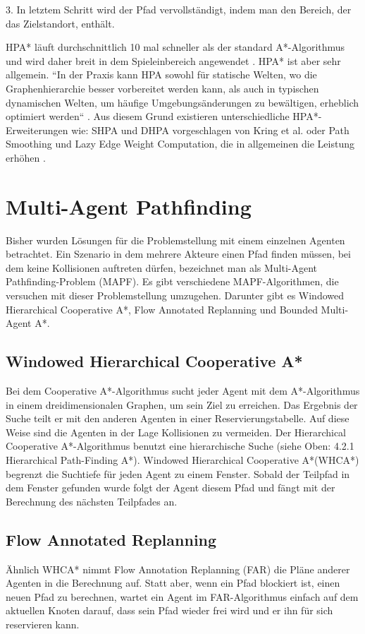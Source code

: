 3. In letztem Schritt wird der Pfad vervollständigt, indem man den Bereich, der das Zielstandort, enthält.\\
\begin{sloppypar}
HPA* läuft durchschnittlich 10 mal schneller als der standard A*-Algorithmus \cite{Bot04} und wird daher breit in dem Spieleinbereich angewendet \cite{LSC08}\cite{Kri10}. HPA* ist aber sehr allgemein. ``In der Praxis kann HPA sowohl für statische Welten, wo die Graphenhierarchie besser vorbereitet werden kann, als auch in typischen dynamischen Welten, um häufige Umgebungsänderungen zu bewältigen, erheblich optimiert werden`` \cite{Kri10}. Aus diesem Grund existieren unterschiedliche  HPA*-Erweiterungen wie: SHPA und DHPA vorgeschlagen von Kring et al.\cite{Kri10} oder Path Smoothing und Lazy Edge Weight Computation, die in allgemeinen die Leistung erhöhen \cite{JB07}.
\end{sloppypar}



\section{Multi-Agent Pathfinding}
Bisher wurden Lösungen für die Problemstellung mit einem einzelnen Agenten betrachtet. Ein Szenario in dem mehrere Akteure einen Pfad finden müssen, bei dem keine Kollisionen auftreten dürfen, bezeichnet man als Multi-Agent Pathfinding-Problem (MAPF). Es gibt verschiedene MAPF-Algorithmen, die versuchen mit dieser Problemstellung umzugehen. Darunter gibt es Windowed Hierarchical Cooperative A*, Flow Annotated Replanning und Bounded Multi-Agent A*.

\subsection{Windowed Hierarchical Cooperative A*}
Bei dem Cooperative A*-Algorithmus sucht jeder Agent mit dem A*-Algorithmus in einem dreidimensionalen Graphen, um sein Ziel zu erreichen. Das Ergebnis der Suche teilt er mit den anderen Agenten in einer Reservierungstabelle. Auf diese Weise sind die Agenten in der Lage Kollisionen zu vermeiden. Der Hierarchical Cooperative A*-Algorithmus benutzt eine hierarchische Suche (siehe Oben: 4.2.1 Hierarchical Path-Finding A*). Windowed Hierarchical Cooperative A*(WHCA*) begrenzt die Suchtiefe für jeden Agent zu einem Fenster. Sobald der Teilpfad in dem Fenster gefunden wurde folgt der Agent diesem Pfad und fängt mit der Berechnung des nächsten Teilpfades an.
\subsection{Flow Annotated Replanning}
Ähnlich WHCA* nimmt Flow Annotation Replanning (FAR) die Pläne anderer Agenten in die Berechnung auf. Statt aber, wenn ein Pfad blockiert ist, einen neuen Pfad zu berechnen, wartet ein Agent im FAR-Algorithmus einfach auf dem aktuellen Knoten darauf, dass sein Pfad wieder frei wird und er ihn für sich reservieren kann.

